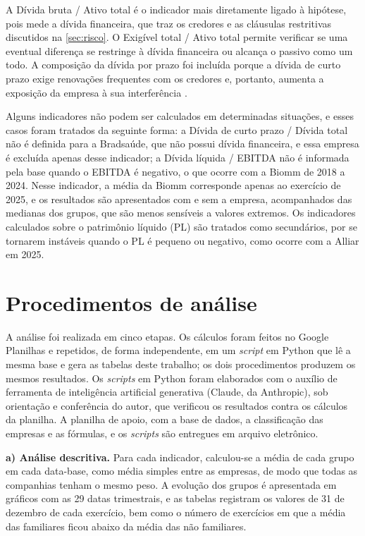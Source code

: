 A Dívida bruta / Ativo total é o indicador mais diretamente ligado à hipótese, pois
mede a dívida financeira, que traz os credores e as cláusulas restritivas
discutidos na \autoref{sec:risco}. O Exigível total / Ativo total permite verificar
se uma eventual diferença se restringe à dívida financeira ou alcança o passivo
como um todo. A composição da dívida por prazo foi incluída porque a dívida de
curto prazo exige renovações frequentes com os credores e, portanto, aumenta a
exposição da empresa à sua interferência \cite{diamond1991}.

Alguns indicadores não podem ser calculados em determinadas situações, e esses
casos foram tratados da seguinte forma: a Dívida de curto prazo / Dívida total não
é definida para a Bradsaúde, que não possui dívida financeira, e essa empresa é
excluída apenas desse indicador; a Dívida líquida / EBITDA não é informada pela
base quando o EBITDA é negativo, o que ocorre com a Biomm de 2018 a 2024. Nesse
indicador, a média da Biomm corresponde apenas ao exercício de 2025, e os resultados
são apresentados com e sem a empresa, acompanhados das medianas dos grupos, que são
menos sensíveis a valores extremos.
Os indicadores calculados sobre o patrimônio líquido (PL) são tratados como
secundários, por se tornarem instáveis quando o PL é pequeno ou negativo, como
ocorre com a Alliar em 2025.

\section{Procedimentos de análise}\label{sec:procedimentos}

A análise foi realizada em cinco etapas. Os cálculos foram feitos no Google
Planilhas e repetidos, de forma independente, em um \textit{script} em Python que
lê a mesma base e gera as tabelas deste trabalho; os dois procedimentos produzem
os mesmos resultados. Os \textit{scripts} em Python foram elaborados com o auxílio
de ferramenta de inteligência artificial generativa (Claude, da Anthropic), sob
orientação e conferência do autor, que verificou os resultados contra os cálculos da
planilha. A planilha de apoio, com a base de dados, a classificação
das empresas e as fórmulas, e os \textit{scripts} são entregues em arquivo
eletrônico.

\textbf{a) Análise descritiva.} Para cada indicador, calculou-se a média de cada
grupo em cada data-base, como média simples entre as empresas, de modo que todas as
companhias tenham o mesmo peso. A evolução dos grupos é apresentada em gráficos com
as 29 datas trimestrais, e as tabelas registram os valores de 31 de dezembro de
cada exercício, bem como o número de exercícios em que a média das familiares
ficou abaixo da média das não familiares.

